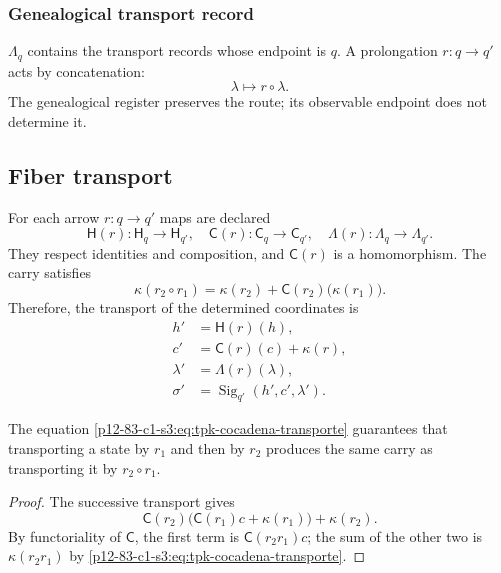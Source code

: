 {\subsubsection{Genealogical transport record}

\(\Lambda_q\) contains the transport records whose endpoint is
\(q\). A prolongation \(r:q\to q'\) acts by concatenation:
\[
 \lambda\longmapsto r\circ\lambda.
\]
The genealogical register preserves the route; its observable endpoint does not determine it.

\subsection{Fiber transport}

For each arrow \(r:q\to q'\) maps are declared
\[
 \mathsf H(r):\mathsf H_q\to\mathsf H_{q'},
 \quad
 \mathsf C(r):\mathsf C_q\to\mathsf C_{q'},
 \quad
 \Lambda(r):\Lambda_q\to\Lambda_{q'}.
\]
They respect identities and composition, and \(\mathsf C(r)\) is a homomorphism.
The carry satisfies
\begin{equation}
 \kappa(r_2\circ r_1)
 =\kappa(r_2)+\mathsf C(r_2)\bigl(\kappa(r_1)\bigr).
\label{p12-83-c1-s3:eq:tpk-cocadena-transporte}
\end{equation}
Therefore, the transport of the determined coordinates is
\begin{align*}
 h'&=\mathsf H(r)(h),\\
 c'&=\mathsf C(r)(c)+\kappa(r),\\
 \lambda'&=\Lambda(r)(\lambda),\\
 \sigma'&=\operatorname{Sig}_{q'}(h',c',\lambda').
\end{align*}

\begin{lemma}
\label{p12-83-c1-s3:lem:tpk-asociatividad-acarreo}
The equation \cref{p12-83-c1-s3:eq:tpk-cocadena-transporte} guarantees that transporting a
state by \(r_1\) and then by \(r_2\) produces the same carry as
transporting it by \(r_2\circ r_1\).
\end{lemma}

\begin{proof}
The successive transport gives
\[
 \mathsf C(r_2)\bigl(\mathsf C(r_1)c+\kappa(r_1)\bigr)+\kappa(r_2).
\]
By functoriality of \(\mathsf C\), the first term is
\(\mathsf C(r_2r_1)c\); the sum of the other two is
\(\kappa(r_2r_1)\) by \cref{p12-83-c1-s3:eq:tpk-cocadena-transporte}.
\end{proof}

}
